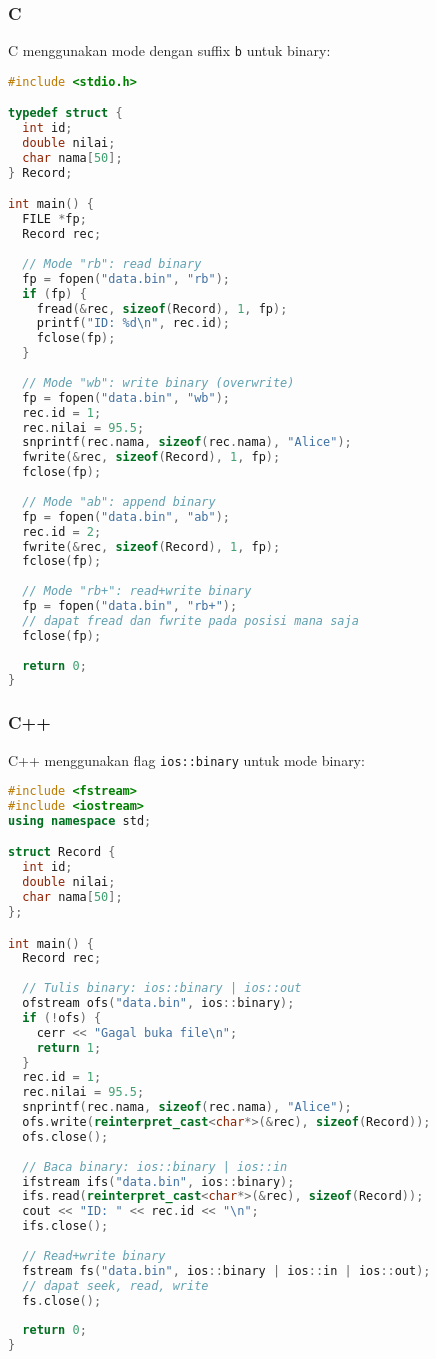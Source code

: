 \documentclass[../main.tex]{subfiles}
\begin{document}
\subsubsection{C}
C menggunakan mode dengan suffix \texttt{b} untuk binary:

\begin{lstlisting}[language=C, caption={Mode file binary di C}]
#include <stdio.h>

typedef struct {
  int id;
  double nilai;
  char nama[50];
} Record;

int main() {
  FILE *fp;
  Record rec;
  
  // Mode "rb": read binary
  fp = fopen("data.bin", "rb");
  if (fp) {
    fread(&rec, sizeof(Record), 1, fp);
    printf("ID: %d\n", rec.id);
    fclose(fp);
  }
  
  // Mode "wb": write binary (overwrite)
  fp = fopen("data.bin", "wb");
  rec.id = 1;
  rec.nilai = 95.5;
  snprintf(rec.nama, sizeof(rec.nama), "Alice");
  fwrite(&rec, sizeof(Record), 1, fp);
  fclose(fp);
  
  // Mode "ab": append binary
  fp = fopen("data.bin", "ab");
  rec.id = 2;
  fwrite(&rec, sizeof(Record), 1, fp);
  fclose(fp);
  
  // Mode "rb+": read+write binary
  fp = fopen("data.bin", "rb+");
  // dapat fread dan fwrite pada posisi mana saja
  fclose(fp);
  
  return 0;
}
\end{lstlisting}

\subsubsection{C++}
C++ menggunakan flag \texttt{ios::binary} untuk mode binary:

\begin{lstlisting}[language=C++, caption={Mode file binary di C++}]
#include <fstream>
#include <iostream>
using namespace std;

struct Record {
  int id;
  double nilai;
  char nama[50];
};

int main() {
  Record rec;
  
  // Tulis binary: ios::binary | ios::out
  ofstream ofs("data.bin", ios::binary);
  if (!ofs) {
    cerr << "Gagal buka file\n";
    return 1;
  }
  rec.id = 1;
  rec.nilai = 95.5;
  snprintf(rec.nama, sizeof(rec.nama), "Alice");
  ofs.write(reinterpret_cast<char*>(&rec), sizeof(Record));
  ofs.close();
  
  // Baca binary: ios::binary | ios::in
  ifstream ifs("data.bin", ios::binary);
  ifs.read(reinterpret_cast<char*>(&rec), sizeof(Record));
  cout << "ID: " << rec.id << "\n";
  ifs.close();
  
  // Read+write binary
  fstream fs("data.bin", ios::binary | ios::in | ios::out);
  // dapat seek, read, write
  fs.close();
  
  return 0;
}
\end{lstlisting}
\end{document}
